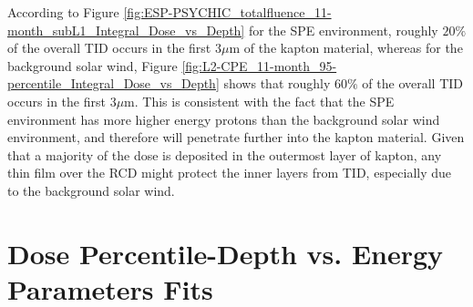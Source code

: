 \documentclass{hitec}
\begin{document}
According to Figure \ref{fig:ESP-PSYCHIC_totalfluence_11-month_subL1_Integral_Dose_vs_Depth} for the SPE environment, roughly $20\%$ of the overall TID occurs in the first $3\mu$m of the kapton material, whereas for the background solar wind, Figure \ref{fig:L2-CPE_11-month_95-percentile_Integral_Dose_vs_Depth} shows that roughly $60\%$ of the overall TID occurs in the first $3\mu$m. This is consistent with the fact that the SPE environment has more higher energy protons than the background solar wind environment, and therefore will penetrate further into the kapton material. Given that a majority of the dose is deposited in the outermost layer of kapton, any thin film over the RCD might protect the inner layers from TID, especially due to the background solar wind. 


\cleardoublepage
{}
{}



\newpage
\appendix

\section{Dose Percentile-Depth vs. Energy Parameters Fits}
\label{App:Dose Percentile-Depth vs. Energy Parameters Fits}
\end{document}
